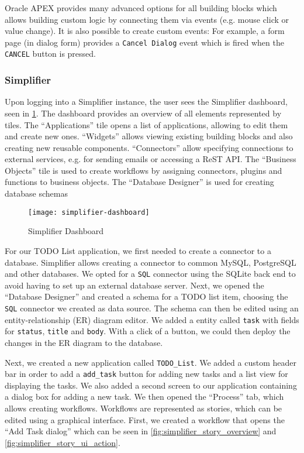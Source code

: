 \documentclass[runningheads]{llncs}
\begin{document}
Oracle APEX provides many advanced options for all building blocks which allows building custom logic by connecting them via events (e.g. mouse click or value change). It is also possible to create custom events: For example, a form page (in dialog form) provides a \texttt{Cancel Dialog} event which is fired when the \texttt{CANCEL} button is pressed.

\subsubsection{Simplifier}

Upon logging into a Simplifier instance, the user sees the Simplifier dashboard, seen in \cref{fig:simplifier_dashboard}. The dashboard provides an overview of all elements represented by tiles. The “Applications” tile opens a list of applications, allowing to edit them and create new ones. “Widgets” allows viewing existing building blocks and also creating new reusable components. “Connectors” allow specifying connections to external services, e.g. for sending emails or accessing a ReST API. The “Business Objects” tile is used to create workflows by assigning connectors, plugins and functions to business objects. The “Database Designer” is used for creating database schemas

\begin{figure}
  \centering
  \texttt{[image: simplifier-dashboard]}
  \caption{Simplifier Dashboard}
  \label{fig:simplifier_dashboard}
\end{figure}

For our TODO List application, we first needed to create a connector to a database. Simplifier allows creating a connector to common MySQL, PostgreSQL and other databases. We opted for a \texttt{SQL} connector using the SQLite back end to avoid having to set up an external database server. Next, we opened the “Database Designer” and created a schema for a TODO list item, choosing the \texttt{SQL} connector we created as data source. The schema can then be edited using an entity-relationship (ER) diagram editor. We added a entity called \texttt{task} with fields for \texttt{status}, \texttt{title} and \texttt{body}. With a click of a button, we could then deploy the changes in the ER diagram to the database.

Next, we created a new application called \texttt{TODO\_List}. We added a custom header bar in order to add a \texttt{add\_task} button for adding new tasks and a list view for displaying the tasks. We also added a second screen to our application containing a dialog box for adding a new task. We then opened the “Process” tab, which allows creating workflows. Workflows are represented as stories, which can be edited using a graphical interface. First, we created a workflow that opens the “Add Task dialog” which can be seen in \cref{fig:simplifier_story_overview} and \cref{fig:simplifier_story_ui_action}.
\end{document}
